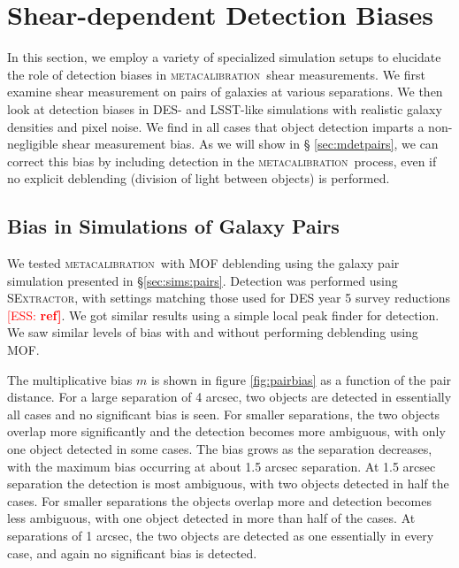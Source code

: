 \documentclass[fleqn,useAMS,usenatbib]{mnras}
\newcommand{\ess}[1]{\textcolor{red}{[ESS: \bf #1]}}
\newcommand{\mcal}{\textsc{metacalibration}}
\newcommand{\sx}{\textsc{SExtractor}}
\begin{document}
\section{Shear-dependent Detection Biases}

In this section, we employ a variety of specialized simulation setups to
elucidate the role of detection biases in \mcal\ shear measurements. We first
examine shear measurement on pairs of galaxies at various separations. We then
look at detection biases in DES- and LSST-like simulations with realistic
galaxy densities and pixel noise. We find in all cases that object detection
imparts a non-negligible shear measurement bias. As we will show in \S
\ref{sec:mdetpairs}, we can correct this bias by including detection in the
\mcal\ process, even if no explicit deblending (division of light between
objects) is performed.

\subsection{Bias in Simulations of Galaxy Pairs}

We tested \mcal\ with MOF deblending using the galaxy pair simulation presented
in \S \ref{sec:sims:pairs}. Detection was performed using \sx, with settings
matching those used for DES year 5 survey reductions \ess{ref}.  We got similar
results using a simple local peak finder for detection. We saw similar levels
of bias with and without performing deblending using MOF.

The multiplicative bias $m$ is shown in figure \ref{fig:pairbias} as a function
of the pair distance. For a large separation of 4 arcsec, two objects are
detected in essentially all cases and no significant bias is seen.  For smaller
separations, the two objects overlap more significantly and the detection
becomes more ambiguous, with only one object detected in some cases.  The bias
grows as the separation decreases, with the maximum bias occurring at about 1.5
arcsec separation. At 1.5 arcsec separation the detection is most ambiguous,
with two objects detected in half the cases. For smaller separations the
objects overlap more and detection becomes less ambiguous, with one object
detected in more than half of the cases. At separations of 1 arcsec, the two
objects are detected as one essentially in every case, and again no significant
bias is detected.
\end{document}
